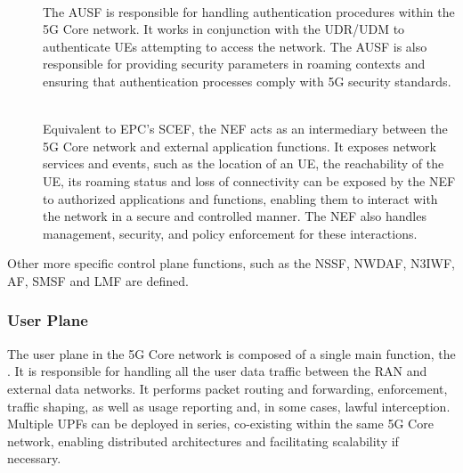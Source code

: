 \begin{description}
  \item[\textbf{}]~\\ 
  The \gls{AUSF} is responsible for handling authentication procedures within the 5G Core network. It works in conjunction with the \gls{UDR}/\gls{UDM} to authenticate \glspl{UE}  attempting to access the network. The \gls{AUSF} is also responsible for providing security parameters in roaming contexts and ensuring that authentication processes comply with 5G security standards. 
  \item[\textbf{}]~\\ 
  Equivalent to \gls{EPC}'s \gls{SCEF}, the \gls{NEF} acts as an intermediary between the 5G Core network and external application functions. It exposes network services and events, such as the location of an \gls{UE}, the reachability of the \gls{UE}, its roaming status and loss of connectivity can be exposed by the \gls{NEF} to authorized applications and functions, enabling them to interact with the network in a secure and controlled manner. The \gls{NEF} also handles  management, security, and policy enforcement for these interactions.
\end{description}
Other more specific control plane functions, such as the \gls{NSSF}, \gls{NWDAF}, \gls{N3IWF}, \gls{AF}, \gls{SMSF} and \gls{LMF} are defined.

\subsubsection{User Plane}
\label{sec:user_plane}
The user plane in the 5G Core network is composed of a single main function, the . It is responsible for handling all the user data traffic between the \gls{RAN} and external data networks. It performs packet routing and forwarding,  enforcement, traffic shaping, as well as usage reporting and, in some cases, lawful interception. Multiple \glspl{UPF} can be deployed in series, co-existing within the same 5G Core network, enabling distributed architectures and facilitating scalability if necessary. 

